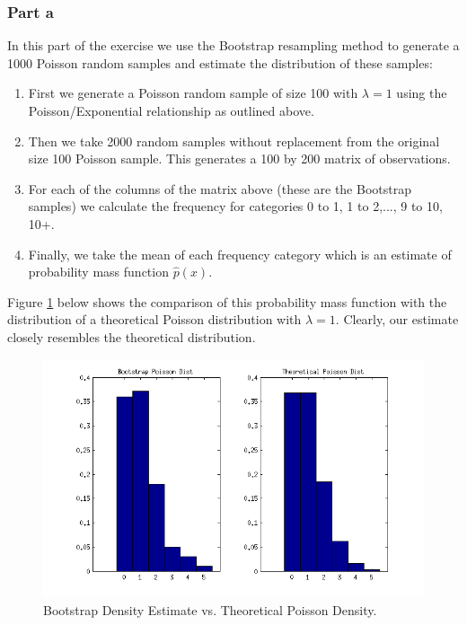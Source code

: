 \documentclass[12pt,a4paper]{article}
\begin{document}
\subsubsection*{Part a}
In this part of the exercise we use the Bootstrap resampling method to generate a 1000 Poisson random samples and estimate the distribution of these samples:
\begin{enumerate}
\item{First we generate a Poisson random sample of size 100 with $\lambda=1$ using the Poisson/Exponential relationship as outlined above.}
\item{Then we take 2000 random samples without replacement from the original size 100 Poisson sample. This generates a 100 by 200 matrix of observations.}
\item{For each of the columns of the matrix above (these are the Bootstrap samples) we calculate the frequency for categories 0 to 1, 1 to 2,..., 9 to 10, 10+.}
\item{Finally, we take the mean of each frequency category which is an estimate of probability mass function $\hat{p}(x)$.}
\end{enumerate}
Figure \ref{q2fig2} below shows the comparison of this probability mass function with the distribution of a theoretical Poisson distribution with $\lambda=1$. Clearly, our estimate closely resembles the theoretical distribution.

\begin{figure}[ht!] 
\begin{center}
\includegraphics[scale=.9]{q2graph2.png}
\caption{Bootstrap Density Estimate vs. Theoretical Poisson Density.}
\label{q2fig2}
\end{center}
\end{figure}
\FloatBarrier
\end{document}
